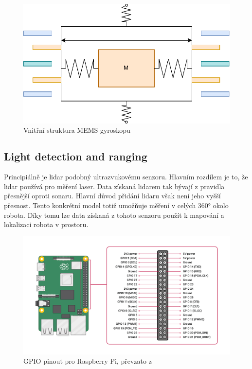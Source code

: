 \begin{figure}[h!]
	\centering
	\includegraphics[scale=0.8]{obrazky-figures/gyroscope.pdf}
	\caption{Vnitřní struktura MEMS gyroskopu}
	\label{fig:mems_gyro}
\end{figure}

\newpage
\subsection*{Light detection and ranging}
Principiálně je lidar podobný ultrazvukovému senzoru. Hlavním rozdílem je to, že lidar používá pro měření laser. Data získaná lidarem tak bývají z pravidla přesnější oproti sonaru. Hlavní důvod přidání lidaru však není jeho vyšší přesnost. Tento konkrétní model totiž umožňuje měření v celých 360° okolo robota. Díky tomu lze data získaná z tohoto senzoru použít k mapování a lokalizaci robota v prostoru. \cite[str:~96-98]{embeded_robotics}

\begin{figure}[h!]
	\centering
	\includegraphics[scale=0.15]{obrazky-figures/gpio_pinout.png}
	\caption[GPIO pinout pro Raspberry Pi]{GPIO pinout pro Raspberry Pi, převzato z \cite{rpi_documentation}}
	\label{fig:rpi_gpio_pinout}
\end{figure}


